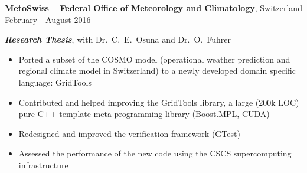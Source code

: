 
\textbf{MetoSwiss -- Federal Office of Meteorology and Climatology}, Switzerland \hfill February - August 2016

\textbf{\textit{Research Thesis}}, with Dr.\ C.\ E.\ Osuna and Dr.\ O.\ Fuhrer

\begin{itemize}
	\item Ported a subset of the COSMO model (operational weather prediction and regional climate model in Switzerland) to a newly developed domain specific language: GridTools
	\item  Contributed and helped improving the GridTools library, a large (200k LOC) pure C++ template meta-programming library (Boost.MPL, CUDA)
	\item Redesigned and improved the verification framework (GTest)
	\item Assessed the performance of the new code using the CSCS supercomputing infrastructure
\end{itemize}
